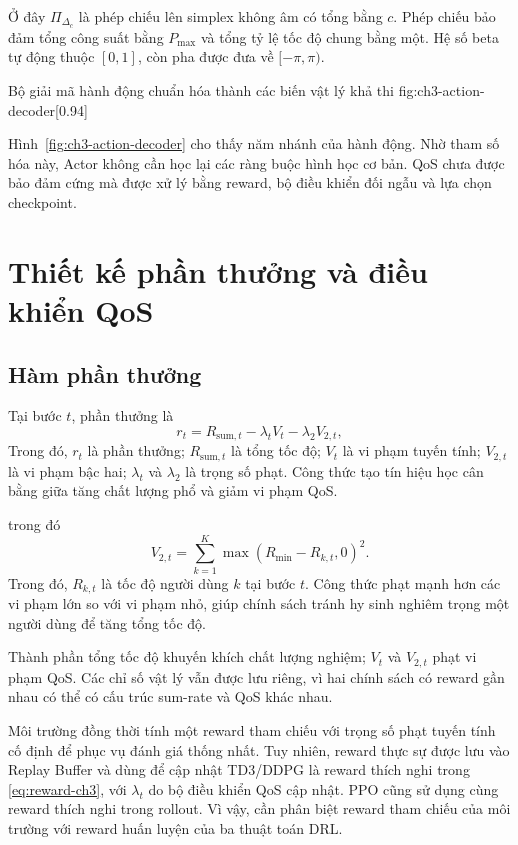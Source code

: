 Ở đây $\Pi_{\Delta_c}$ là phép chiếu lên simplex không âm có tổng bằng $c$. Phép chiếu bảo đảm tổng công suất bằng $P_{\max}$ và tổng tỷ lệ tốc độ chung bằng một. Hệ số beta tự động thuộc $[0,1]$, còn pha được đưa về $[-\pi,\pi)$.

{Bộ giải mã hành động chuẩn hóa thành các biến vật lý khả thi}
{fig:ch3-action-decoder}[0.94\linewidth]

Hình~\ref{fig:ch3-action-decoder} cho thấy năm nhánh của hành động. Nhờ tham số hóa này, Actor không cần học lại các ràng buộc hình học cơ bản. QoS chưa được bảo đảm cứng mà được xử lý bằng reward, bộ điều khiển đối ngẫu và lựa chọn checkpoint.

\section{Thiết kế phần thưởng và điều khiển QoS}
\subsection{Hàm phần thưởng}
Tại bước $t$, phần thưởng là
\begin{equation}
 r_t=R_{\mathrm{sum},t}-\lambda_tV_t-\lambda_2V_{2,t},
 \label{eq:reward-ch3}
\end{equation}
Trong đó, $r_t$ là phần thưởng; $R_{\mathrm{sum},t}$ là tổng tốc độ; $V_t$ là vi phạm tuyến tính; $V_{2,t}$ là vi phạm bậc hai; $\lambda_t$ và $\lambda_2$ là trọng số phạt. Công thức tạo tín hiệu học cân bằng giữa tăng chất lượng phổ và giảm vi phạm QoS.

trong đó
\begin{equation}
 V_{2,t}=\sum_{k=1}^{K}\max(R_{\min}-R_{k,t},0)^2.
\end{equation}
Trong đó, $R_{k,t}$ là tốc độ người dùng $k$ tại bước $t$. Công thức phạt mạnh hơn các vi phạm lớn so với vi phạm nhỏ, giúp chính sách tránh hy sinh nghiêm trọng một người dùng để tăng tổng tốc độ.

Thành phần tổng tốc độ khuyến khích chất lượng nghiệm; $V_t$ và $V_{2,t}$ phạt vi phạm QoS. Các chỉ số vật lý vẫn được lưu riêng, vì hai chính sách có reward gần nhau có thể có cấu trúc sum-rate và QoS khác nhau.

Môi trường đồng thời tính một reward tham chiếu với trọng số phạt tuyến tính cố định để phục vụ đánh giá thống nhất. Tuy nhiên, reward thực sự được lưu vào Replay Buffer và dùng để cập nhật TD3/DDPG là reward thích nghi trong \eqref{eq:reward-ch3}, với $\lambda_t$ do bộ điều khiển QoS cập nhật. PPO cũng sử dụng cùng reward thích nghi trong rollout. Vì vậy, cần phân biệt reward tham chiếu của môi trường với reward huấn luyện của ba thuật toán DRL.

